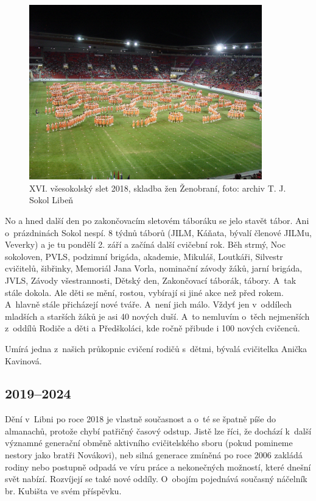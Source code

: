 \documentclass[a5paper, 11pt, twoside]{article}
\begin{document}
\begin{figure}[hp]
  \centering 
  \includegraphics[width=0.9\textwidth]{img/65_zenobrani.JPG}
  \caption*{XVI. všesokolský slet 2018, skladba žen Ženobraní, foto: archiv T.
  J. Sokol Libeň}
\end{figure}

No a hned další den po zakončovacím sletovém táboráku se jelo stavět
tábor. Ani o~prázdninách Sokol nespí. 8 týdnů táborů (JILM, Káňata,
bývalí členové JILMu, Veverky) a je tu pondělí 2. září a začíná další
cvičební rok. Běh strmý, Noc sokoloven, PVLS, podzimní brigáda,
akademie, Mikuláš, Loutkáři, Silvestr cvičitelů, šibřinky, Memoriál Jana
Vorla, nominační závody žáků, jarní brigáda, JVLS, Závody všestrannosti,
Dětský den, Zakončovací táborák, tábory. A~tak stále dokola. Ale děti se
mění, rostou, vybírají si jiné akce než před rokem. A~hlavně stále
přicházejí nové tváře. A~není jich málo. Vždyť jen v~oddílech mladších a
starších žáků je asi 40 nových duší. A~to nemluvím o~těch nejmenších
z~oddílů Rodiče a děti a Předškoláci, kde ročně přibude i 100 nových
cvičenců.

Umírá jedna z~našich průkopnic cvičení rodičů s~dětmi, bývalá cvičitelka
Anička Kavinová.

\afterpage{\clearpage}

\subsection{2019--2024}

Dění v~Libni po roce 2018 je vlastně současnost a o~té se špatně píše do
almanachů, protože chybí patřičný časový odstup. Jistě lze říci, že
dochází k~další významné generační obměně aktivního cvičitelského sboru
(pokud pomineme nestory jako bratři Novákovi), neb silná generace
zmíněná po roce 2006 zakládá rodiny nebo postupně odpadá ve víru práce a
nekonečných možností, které dnešní svět nabízí. Rozvíjejí se také nové
oddíly. O~obojím pojednává současný náčelník br. Kubišta ve svém
příspěvku.
\end{document}
